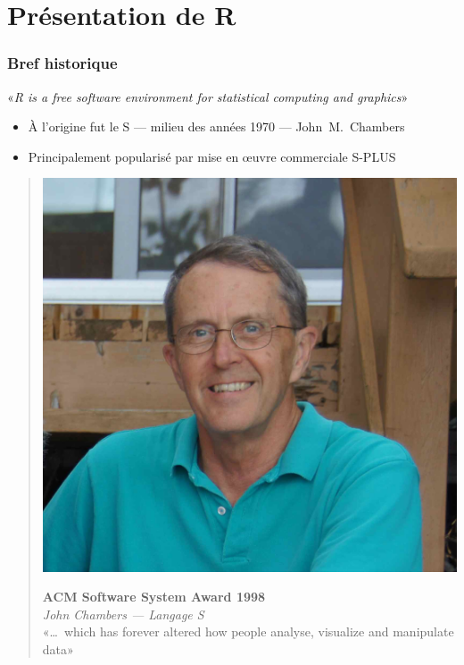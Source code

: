\section{Présentation de R}

\begin{frame}
  \frametitle{Bref historique}

  «\emph{R is a free software environment for statistical computing and graphics}»
  \bigskip

  \begin{itemize}
  \item À l'origine fut le S --- milieu des années 1970 --- John~M.\ Chambers
  \item Principalement popularisé par mise en {\oe}uvre commerciale
    S-PLUS
  \end{itemize}
  \bigskip

  \begin{quote}
    \begin{minipage}{0.35\linewidth}
      \includegraphics[width=\linewidth,keepaspectratio]{Chambers}
    \end{minipage}
    \hfill
    \begin{minipage}{0.6\linewidth}
      \raggedright
      \textbf{ACM Software System Award 1998} \\
      \emph{John Chambers --- Langage S} \\[\baselineskip]

      «\dots\ which has forever altered how people analyse,
        visualize and manipulate data»
    \end{minipage}
  \end{quote}
\end{frame}

